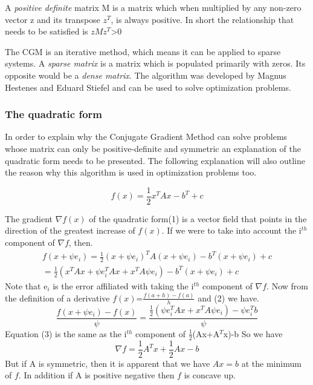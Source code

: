 \documentclass[12pt,twosided]{article}
\begin{document}
A \emph{positive definite} matrix M is a matrix which when multiplied by any non-zero vector z and its transpose $z^T$, is always positive. In short the relationship that needs to be satisfied is $zMz^T$>0

The CGM is an iterative method, which means it can be applied to sparse systems. A \emph{sparse matrix} is a matrix which is populated primarily with zeros. Its opposite would be a \emph{dense matrix}. The algorithm was developed by Magnus Hestenes and Eduard Stiefel and can be used to solve optimization problems\cite{press2007numerical}.
\subsubsection{The quadratic form}
In order to explain why the Conjugate Gradient Method can solve problems whose matrix can only be positive-definite and symmetric an explanation of the quadratic form needs to be presented. The following explanation will also outline the reason why this algorithm is used in optimization problems too.
\begin{center}
\begin{equation}
f(x)=\frac{1}{2}x^TAx-b^T+c
\end{equation}
\end{center}

The gradient $\nabla f(x)$ of the quadratic form(1) is a vector field that points in the direction of the greatest increase of $f(x)$. If we were to take into account the i$^{th}$ component of $\nabla f$, then.
\begin{equation}
\begin{split}
f(x+\psi e_i)= \frac{1}{2} (x+\psi e_i)^TA(x+\psi e_i)-b^T(x+\psi e_i)+c\\
= \frac{1}{2} (x^TAx+\psi e^T_iAx +x^TA\psi e_i)-b^T(x+\psi e_i)+c
\end{split}
\end{equation}
Note that e$_i$ is the error affiliated with taking the i$^{th}$ component of $\nabla f$. Now from the definition of a derivative $f(x)$=$\frac{f(a+h)-f(a)}{h}$ and (2) we have.
\begin{equation}
\frac{f(x+\psi e_i)-f(x)}{\psi}=\frac{\frac{1}{2}(\psi e^T_iAx+x^TA\psi e_i)-\psi e^T_ib}{\psi}
\end{equation}
Equation (3) is the same as the i$^{th}$ component of $\frac{1}{2}$(Ax+A$^T$x)-b
So we have
\begin{equation}
\nabla f =\frac{1}{2}A^Tx+\frac{1}{2}Ax-b
\end{equation}
But if A is symmetric, then it is apparent that we have $Ax=b$ at the minimum of $f$. In addition if A is positive negative then $f$ is concave up. 
\end{document}
